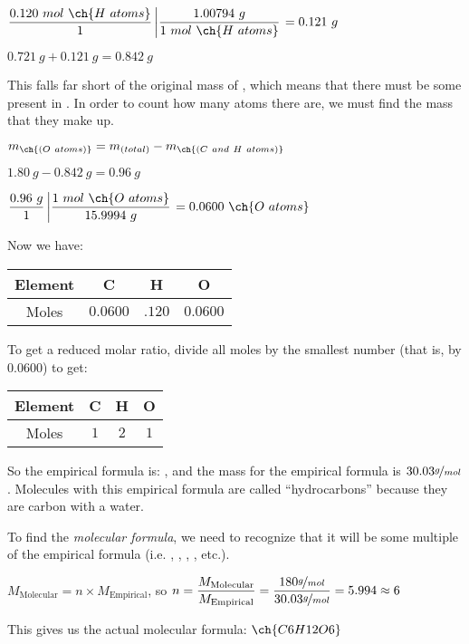 \documentclass[12pt, openany, letterpaper]{memoir}
\begin{document}
\vspace{0.5em}
$\dfrac{0.120~mol~\ch{H~atoms}}{1}\left|\dfrac{1.00794~g}{1~mol~\ch{H~atoms}}\right.=0.121~g$

\vspace{0.5em}
$0.721~g + 0.121~g = 0.842~g$

This falls far short of the original mass of , which means that there must be some  present in . In order to count how many  atoms there are, we must find the mass that they make up.

$m_{\ch{(O~atoms)}} = m_{(total)} - m_{\ch{(C~and~H~atoms)}}$

\vspace{0.5em}
$1.80~g - 0.842~g = 0.96~g$

\vspace{0.5em}
$\dfrac{0.96~g}{1}\left|\dfrac{1~mol~\ch{O~atoms}}{15.9994~g}\right. = 0.0600~\ch{O~atoms}$

Now we have:

\begin{tabular}{c|c|c|c}
Element & C & H & O \\ \midrule
Moles & $0.0600$ & $.120$ & $0.0600$
\end{tabular}

To get a reduced molar ratio, divide all moles by the smallest number (that is, by $0.0600$) to get:

\begin{tabular}{c|c|c|c}
Element & C & H & O \\ \midrule
Moles & $1$ & $2$ & $1$
\end{tabular}

So the empirical formula is: , and the mass for the empirical formula is $30.03\nicefrac{g}{mol}$. Molecules with this empirical formula are called ``hydrocarbons'' because they are carbon with a water.

To find the \emph{molecular formula}, we need to recognize that it will be some multiple of the empirical formula (i.e. , , , , etc.).

$M_{\mathrm{Molecular}} = n\times M_{\mathrm{Empirical}}$, so $n = \dfrac{M_{\mathrm{Molecular}}}{M_{\mathrm{Empirical}}} = \dfrac{180\nicefrac{g}{mol}}{30.03\nicefrac{g}{mol}}=5.994\approx 6$

This gives us the actual molecular formula: $\ch{C6H12O6}$
\end{document}
